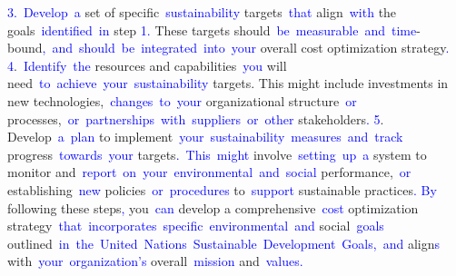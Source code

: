 \documentclass{article}
\begin{document}
\begin{tcolorbox}[colframe=black,colback=white]
{}\textcolor{blue}{3}\textcolor{blue}{.}\textcolor{blue}{~Develop}\textcolor{blue}{~a} set of specific\textcolor{blue}{~sustainability} targets\textcolor{blue}{~that} align\textcolor{blue}{~with} the goals\textcolor{blue}{~identified}\textcolor{blue}{~in} step \textcolor{blue}{1}\textcolor{blue}{.} These targets should\textcolor{blue}{~be}\textcolor{blue}{~measurable}\textcolor{blue}{~and}\textcolor{blue}{~time}-bound\textcolor{blue}{,}\textcolor{blue}{~and}\textcolor{blue}{~should}\textcolor{blue}{~be}\textcolor{blue}{~integrated}\textcolor{blue}{~into}\textcolor{blue}{~your} overall cost optimization strategy\textcolor{blue}{.
}\textcolor{blue}{4}.\textcolor{blue}{~Identify}\textcolor{blue}{~the} resources and capabilities\textcolor{blue}{~you} will need\textcolor{blue}{~to}\textcolor{blue}{~achieve}\textcolor{blue}{~your}\textcolor{blue}{~sustainability} targets. This might include investments in new technologies,\textcolor{blue}{~changes}\textcolor{blue}{~to}\textcolor{blue}{~your} organizational structure\textcolor{blue}{~or} processes,\textcolor{blue}{~or}\textcolor{blue}{~partnerships}\textcolor{blue}{~with}\textcolor{blue}{~suppliers}\textcolor{blue}{~or}\textcolor{blue}{~other} stakeholders\textcolor{blue}{.
}\textcolor{blue}{5}. Develop\textcolor{blue}{~a}\textcolor{blue}{~plan} to implement\textcolor{blue}{~your}\textcolor{blue}{~sustainability}\textcolor{blue}{~measures}\textcolor{blue}{~and}\textcolor{blue}{~track} progress\textcolor{blue}{~towards}\textcolor{blue}{~your} targets\textcolor{blue}{.}\textcolor{blue}{~This}\textcolor{blue}{~might} involve\textcolor{blue}{~setting}\textcolor{blue}{~up}\textcolor{blue}{~a} system to monitor and\textcolor{blue}{~report}\textcolor{blue}{~on}\textcolor{blue}{~your}\textcolor{blue}{~environmental}\textcolor{blue}{~and}\textcolor{blue}{~social} performance,\textcolor{blue}{~or} establishing\textcolor{blue}{~new} policies\textcolor{blue}{~or}\textcolor{blue}{~procedures} to\textcolor{blue}{~support} sustainable practices\textcolor{blue}{.
}\textcolor{blue}{By} following these steps\textcolor{blue}{,} you\textcolor{blue}{~can} develop a comprehensive\textcolor{blue}{~cost} optimization strategy\textcolor{blue}{~that}\textcolor{blue}{~incorporates}\textcolor{blue}{~specific}\textcolor{blue}{~environmental}\textcolor{blue}{~and} social\textcolor{blue}{~goals} outlined\textcolor{blue}{~in}\textcolor{blue}{~the}\textcolor{blue}{~United}\textcolor{blue}{~Nations}\textcolor{blue}{~Sustainable}\textcolor{blue}{~Development}\textcolor{blue}{~Goals}\textcolor{blue}{,}\textcolor{blue}{~and} align\textcolor{blue}{s} with\textcolor{blue}{~your}\textcolor{blue}{~organization}\textcolor{blue}{'s} overall\textcolor{blue}{~mission} and\textcolor{blue}{~values}\textcolor{blue}{.}\textcolor{blue}{}
\end{tcolorbox}
\end{document}
